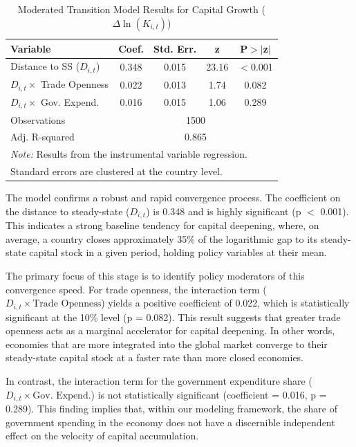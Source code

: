 \documentclass[]{article}
\begin{document}
\begin{table}[h!]
\centering
\caption{Moderated Transition Model Results for Capital Growth ($\Delta \ln(K_{i,t})$)}
\label{tab:moderation_results}
\begin{tabular}{lcccc}
\hline
\hline
Variable & Coef. & Std. Err. & z & P$>$$|$z$|$ \\
\hline
Distance to SS ($D_{i,t}$) & 0.348 & 0.015 & 23.16 & $<$0.001 \\
$D_{i,t} \times$ Trade Openness & 0.022 & 0.013 & 1.74 & 0.082 \\
$D_{i,t} \times$ Gov. Expend. & 0.016 & 0.015 & 1.06 & 0.289 \\
\hline
Observations & \multicolumn{4}{c}{1500} \\
Adj. R-squared & \multicolumn{4}{c}{0.865} \\
\hline
\multicolumn{5}{l}{\footnotesize \textit{Note:} Results from the instrumental variable regression. }\\
\multicolumn{5}{l}{\footnotesize Standard errors are clustered at the country level.}
\end{tabular}
\end{table}

The model confirms a robust and rapid convergence process. The coefficient on the distance to steady-state ($D_{i,t}$) is 0.348 and is highly significant (p $<$ 0.001). This indicates a strong baseline tendency for capital deepening, where, on average, a country closes approximately 35\% of the logarithmic gap to its steady-state capital stock in a given period, holding policy variables at their mean.

The primary focus of this stage is to identify policy moderators of this convergence speed. For trade openness, the interaction term ($D_{i,t} \times \text{Trade Openness}$) yields a positive coefficient of 0.022, which is statistically significant at the 10\% level (p = 0.082). This result suggests that greater trade openness acts as a marginal accelerator for capital deepening. In other words, economies that are more integrated into the global market converge to their steady-state capital stock at a faster rate than more closed economies.

In contrast, the interaction term for the government expenditure share ($D_{i,t} \times \text{Gov. Expend.}$) is not statistically significant (coefficient = 0.016, p = 0.289). This finding implies that, within our modeling framework, the share of government spending in the economy does not have a discernible independent effect on the velocity of capital accumulation.
\end{document}
